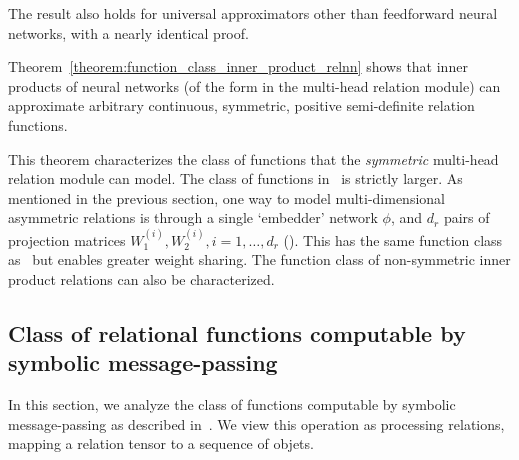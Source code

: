 \begin{remark}
	The result also holds for universal approximators other than feedforward neural networks, with a nearly identical proof.
\end{remark}

Theorem~\ref{theorem:function_class_inner_product_relnn} shows that inner products of neural networks (of the form in the multi-head relation module) can approximate arbitrary continuous, symmetric, positive semi-definite relation functions.

This theorem characterizes the class of functions that the \textit{symmetric} multi-head relation module can model. The class of functions in~ is strictly larger. As mentioned in the previous section, one way to model multi-dimensional asymmetric relations is through a single `embedder' network $\phi$, and $d_r$ pairs of projection matrices $W_1^{(i)}, W_2^{(i)}, i = 1, \ldots, d_r$ (). This has the same function class as~ but enables greater weight sharing. The function class of non-symmetric inner product relations can also be characterized.

\subsection{Class of relational functions computable by symbolic message-passing}\label{ssec:function_class_symbolic_mp}

In this section, we analyze the class of functions computable by symbolic message-passing as described in~. We view this operation as processing relations, mapping a relation tensor to a sequence of objets.

